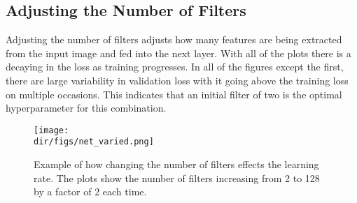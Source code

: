 \subsection{Adjusting the Number of Filters}
Adjusting the number of filters adjusts how many features are being extracted from the input image and fed into the next layer. With all of the plots there is a decaying in the loss as training progresses. In all of the figures except the first, there are large variability in validation loss with it going above the training loss on multiple occasions. This indicates that an initial filter of two is the optimal hyperparameter for this combination. 
\begin{figure}[htpb]
    \centering
    \texttt{[image: \\dir/figs/net\_varied.png]}
    \caption[Example of the effect of changing the number of filters in each Convolution layer]{Example of how changing the number of filters effects the learning rate. The plots show the number of filters increasing from 2 to 128 by a factor of 2 each time.}
    \label{fig.net_varied}
\end{figure}

